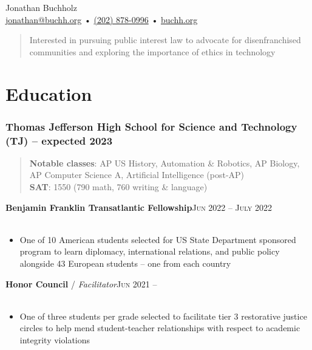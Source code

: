 \documentclass[12pt, a4paper]{article}
\begin{document}
{\LARGE Jonathan Buchholz}\\
\href{mailto:jonathan@buchh.org}{jonathan@buchh.org} • \href{tel:2028780996}{(202) 878-0996} • \href{https://buchh.org}{buchh.org}\\

\vspace{-6mm}
\begin{quote}
Interested in pursuing public interest law to advocate for disenfranchised communities and exploring the importance of ethics in technology\\
\end{quote}

\vspace{-14mm}
\section*{Education}
\vspace{-4mm}

\subsubsection*{Thomas Jefferson High School for Science and Technology (TJ) -- expected 2023}

\begin{quote}

\vspace{-1mm}
\textbf{Notable classes}: AP US History, Automation \& Robotics, AP Biology, AP Computer Science A, Artificial Intelligence (post-AP)\\

\vspace{-6mm}
\textbf{SAT}: 1550 (790 math, 760 writing \& language)\\

\end{quote}

\vspace{-6mm}
\textbf{Benjamin Franklin Transatlantic Fellowship}\hfill\textsc{Jun 2022 -- July 2022}\\\
\begin{itemize}
    \vspace{-8mm}
    \item One of 10 American students selected for US State Department sponsored program to learn diplomacy, international relations, and public policy alongside 43 European students – one from each country
\end{itemize}

\textbf{Honor Council} / \textit{Facilitator}\hfill\textsc{Jun 2021 --}\\\
\begin{itemize}
    \vspace{-8mm}
    \item One of three students per grade selected to facilitate tier 3 restorative justice circles to help mend student-teacher relationships with respect to academic integrity violations
\end{itemize}
\end{document}
